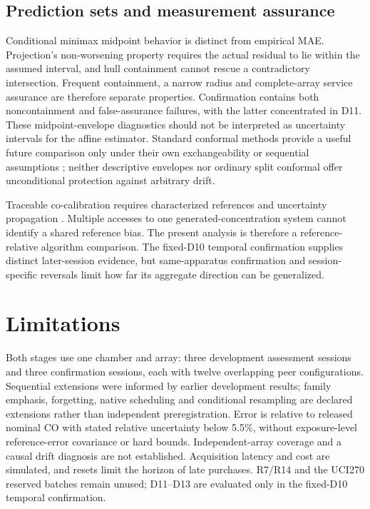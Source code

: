 \subsection{Prediction sets and measurement assurance}
Conditional minimax midpoint behavior is distinct from empirical MAE. Projection's non-worsening property requires the actual residual to lie within the assumed interval, and hull containment cannot rescue a contradictory intersection. Frequent containment, a narrow radius and complete-array service assurance are therefore separate properties. Confirmation contains both noncontainment and false-assurance failures, with the latter concentrated in D11. These midpoint-envelope diagnostics should not be interpreted as uncertainty intervals for the affine estimator. Standard conformal methods provide a useful future comparison only under their own exchangeability or sequential assumptions \cite{angelopoulos2021}; neither descriptive envelopes nor ordinary split conformal offer unconditional protection against arbitrary drift.

Traceable co-calibration requires characterized references and uncertainty propagation \cite{gruber2023,jcgm100,jcgm200}. Multiple accesses to one generated-concentration system cannot identify a shared reference bias. The present analysis is therefore a reference-relative algorithm comparison. The fixed-D10 temporal confirmation supplies distinct later-session evidence, but same-apparatus confirmation and session-specific reversals limit how far its aggregate direction can be generalized.

\section{Limitations}\label{sec:limitations}
Both stages use one chamber and array: three development assessment sessions and three confirmation sessions, each with twelve overlapping peer configurations. Sequential extensions were informed by earlier development results; family emphasis, forgetting, native scheduling and conditional resampling are declared extensions rather than independent preregistration. Error is relative to released nominal CO with stated relative uncertainty below 5.5\%, without exposure-level reference-error covariance or hard bounds. Independent-array coverage and a causal drift diagnosis are not established. Acquisition latency and cost are simulated, and resets limit the horizon of late purchases. R7/R14 and the UCI270 reserved batches remain unused; D11--D13 are evaluated only in the fixed-D10 temporal confirmation.

